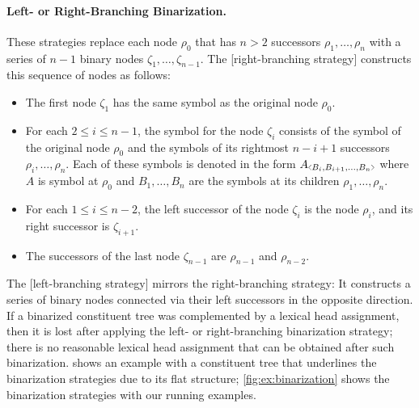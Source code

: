 \documentclass[../../document.tex]{subfiles}
\begin{document}
    \paragraph{Left- or Right-Branching Binarization.}
    These strategies replace each node \(\rho_0\) that has \( n>2 \) successors \(\rho_1, \ldots, \rho_n\) with a series of \( n-1 \) binary nodes \(\zeta_1, \ldots, \zeta_{n-1}\).
    The [right-branching strategy]  constructs this sequence of nodes as follows:
    \begin{itemize}
        \item The first node \(\zeta_1\) has the same symbol as the original node \(\rho_0\).
        \item For each \(2 \leq i \leq n-1\), the symbol for the node \(\zeta_i\) consists of the symbol of the original node \(\rho_0\) and the symbols of its rightmost \(n-i+1\) successors \(\rho_{i}, \ldots, \rho_n\). Each of these symbols is denoted in the form \(A\binsym{B_i,B_{i+1},\ldots,B_n}\) where \(A\) is symbol at \(\rho_0\) and \(B_1, \ldots, B_n\) are the symbols at its children \(\rho_1, \ldots, \rho_n\).
        \item For each \(1 \leq i \leq n-2\), the left successor of the node \(\zeta_i\) is the node \(\rho_i\), and its right successor is \(\zeta_{i+1}\).
        \item The successors of the last node \(\zeta_{n-1}\) are \(\rho_{n-1}\) and \(\rho_{n-2}\).
    \end{itemize}
    The [left-branching strategy]  mirrors the right-branching strategy: It constructs a series of binary nodes connected via their left successors in the opposite direction.
    If a binarized constituent tree was complemented by a lexical head assignment, then it is lost after applying the left- or right-branching binarization strategy; there is no reasonable lexical head assignment that can be obtained after such binarization.
     shows an example with a constituent tree that underlines the binarization strategies due to its flat structure; \cref{fig:ex:binarization} shows the binarization strategies with our running examples.
\end{document}

